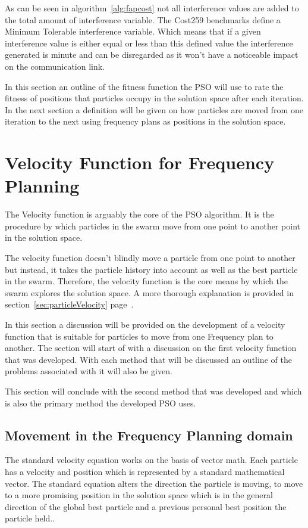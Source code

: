 As can be seen in algorithm~\ref{alg:fapcost} not all interference values are added to the total amount of interference variable. The Cost259 benchmarks define a Minimum Tolerable interference variable. Which means that if a given interference value is either equal or less than this defined value the interference generated is minute and can be disregarded as it won't have a noticeable impact on the communication link.

In this section an outline of the fitness function the PSO will use to rate the fitness of positions that particles occupy in the solution space after each iteration. In the next section a definition will be given on how particles are moved from one iteration to the next using frequency plans as positions in the solution space.
\section{Velocity Function for Frequency Planning}
\label{sec:velocityFAP}
The Velocity function is arguably the core of the PSO algorithm. It is the procedure by which particles in the swarm move from one point to another point in the solution space. 

The velocity function doesn't blindly move a particle from one point to another but instead, it takes the particle history into account as well as the best particle in the swarm. Therefore, the velocity function is the core means by which
the swarm explores the solution space. A more thorough explanation is provided in section~\ref{sec:particleVelocity} page~\pageref{sec:particleVelocity}.

In this section a discussion will be provided on the development of a velocity function that is suitable for particles to move from one Frequency plan to another. The section will start of with a discussion on the first velocity function that was developed. With each method that will be discussed an outline of the problems associated with it will also be given. 

This section will conclude with the second method that was developed and which is also the primary method the developed PSO uses.

\subsection{Movement in the Frequency Planning domain}
The standard velocity equation works on the basis of vector math. Each particle has a velocity and position which is represented by a standard mathematical vector. The standard equation alters the direction the particle is moving, to move to a more promising position in the solution space which is in the general direction of the global best particle and a previous personal best position the particle held..

